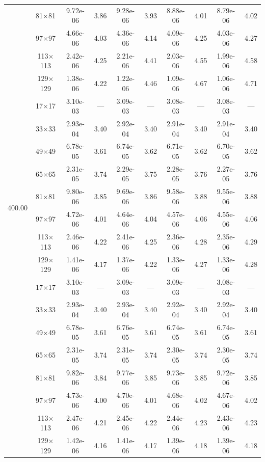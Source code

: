 \begin{table}[H]
{\begin{tabular*}{\textwidth}{@{\extracolsep\fill}c|c|cc|cc|cc|cc@{}}
                & 81$\times$81 & 9.72e-06 & 3.86 & 9.28e-06 & 3.93 & 8.88e-06 & 4.01 & 8.79e-06 & 4.02 \\
                & 97$\times$97 & 4.66e-06 & 4.03 & 4.36e-06 & 4.14 & 4.09e-06 & 4.25 & 4.03e-06 & 4.27 \\
                & 113$\times$113 & 2.42e-06 & 4.25 & 2.21e-06 & 4.41 & 2.03e-06 & 4.55 & 1.99e-06 & 4.58 \\
                & 129$\times$129 & 1.38e-06 & 4.22 & 1.22e-06 & 4.46 & 1.09e-06 & 4.67 & 1.06e-06 & 4.71 \\
                \midrule
                \multirow{10}{*}{400.00} & 17$\times$17 & 3.10e-03 & --- & 3.09e-03 & --- & 3.08e-03 & --- & 3.08e-03 & --- \\
                & 33$\times$33 & 2.93e-04 & 3.40 & 2.92e-04 & 3.40 & 2.91e-04 & 3.40 & 2.91e-04 & 3.40 \\
                & 49$\times$49 & 6.78e-05 & 3.61 & 6.74e-05 & 3.62 & 6.71e-05 & 3.62 & 6.70e-05 & 3.62 \\
                & 65$\times$65 & 2.31e-05 & 3.74 & 2.29e-05 & 3.75 & 2.28e-05 & 3.76 & 2.27e-05 & 3.76 \\
                & 81$\times$81 & 9.80e-06 & 3.85 & 9.69e-06 & 3.86 & 9.58e-06 & 3.88 & 9.55e-06 & 3.88 \\
                & 97$\times$97 & 4.72e-06 & 4.01 & 4.64e-06 & 4.04 & 4.57e-06 & 4.06 & 4.55e-06 & 4.06 \\
                & 113$\times$113 & 2.46e-06 & 4.22 & 2.41e-06 & 4.25 & 2.36e-06 & 4.28 & 2.35e-06 & 4.29 \\
                & 129$\times$129 & 1.41e-06 & 4.17 & 1.37e-06 & 4.22 & 1.33e-06 & 4.27 & 1.33e-06 & 4.28 \\
                \midrule
                \multirow{10}{*}{1000.00} & 17$\times$17 & 3.10e-03 & --- & 3.09e-03 & --- & 3.09e-03 & --- & 3.08e-03 & --- \\
                & 33$\times$33 & 2.93e-04 & 3.40 & 2.93e-04 & 3.40 & 2.92e-04 & 3.40 & 2.92e-04 & 3.40 \\
                & 49$\times$49 & 6.78e-05 & 3.61 & 6.76e-05 & 3.61 & 6.74e-05 & 3.61 & 6.74e-05 & 3.61 \\
                & 65$\times$65 & 2.31e-05 & 3.74 & 2.31e-05 & 3.74 & 2.30e-05 & 3.74 & 2.30e-05 & 3.74 \\
                & 81$\times$81 & 9.82e-06 & 3.84 & 9.77e-06 & 3.85 & 9.73e-06 & 3.85 & 9.72e-06 & 3.85 \\
                & 97$\times$97 & 4.73e-06 & 4.00 & 4.70e-06 & 4.01 & 4.68e-06 & 4.02 & 4.67e-06 & 4.02 \\
                & 113$\times$113 & 2.47e-06 & 4.21 & 2.45e-06 & 4.22 & 2.44e-06 & 4.23 & 2.43e-06 & 4.23 \\
                & 129$\times$129 & 1.42e-06 & 4.16 & 1.41e-06 & 4.17 & 1.39e-06 & 4.18 & 1.39e-06 & 4.18 \\
                \bottomrule
            \end{tabular*}
	}{%
		\fdadospesquisa
	}
\end{table}

